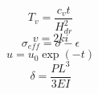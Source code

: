 \begin{equation}\label{eq:tv}
T_v = \frac{c_v t}{H_{dr}^2}
\end{equation}
\begin{equation}\label{eq:darcy}
v = 2 k i
\end{equation}
\begin{equation}\label{eq:bad}
\sigma_{eff} = \sigma - \epsilon
\end{equation}
\begin{equation}\label{eq:decay}
u = u_0 \exp(-t)
\end{equation}
\begin{equation}\label{eq:deflection}
\delta = \frac{P L^3}{3 E I}
\end{equation}
